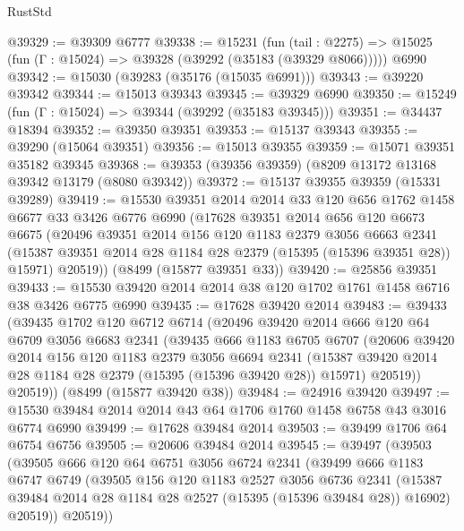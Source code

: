 \begin{lexlean}{RustStd}
\begin{coremodule}
@39329 := @39309 @6777
@39338 := @15231
    (fun (tail : @2275) => @15025 (fun (Γ : @15024) => @39328 (@39292 (@35183 (@39329 @8066)))))
    @6990
@39342 := @15030 (@39283 (@35176 (@15035 @6991)))
@39343 := @39220 @39342
@39344 := @15013 @39343
@39345 := @39329 @6990
@39350 := @15249 (fun (Γ : @15024) => @39344 (@39292 (@35183 @39345)))
@39351 := @34437 @18394
@39352 := @39350 @39351
@39353 := @15137 @39343
@39355 := @39290 (@15064 @39351)
@39356 := @15013 @39355
@39359 := @15071 @39351 @35182 @39345
@39368 := @39353 (@39356 @39359) (@8209 @13172 @13168 @39342 @13179 (@8080 @39342))
@39372 := @15137 @39355 @39359 (@15331 @39289)
@39419 := @15530
    @39351
    @2014
    @2014
    @33
    @120
    @656
    @1762
    @1458
    @6677
    @33
    @3426
    @6776
    @6990
    (@17628
      @39351
      @2014
      @656
      @120
      @6673
      @6675
      (@20496
        @39351
        @2014
        @156
        @120
        @1183
        @2379
        @3056
        @6663
        @2341
        (@15387 @39351 @2014 @28 @1184 @28 @2379 (@15395 (@15396 @39351 @28)) @15971)
        @20519))
    (@8499 (@15877 @39351 @33))
@39420 := @25856 @39351
@39433 := @15530 @39420 @2014 @2014 @38 @120 @1702 @1761 @1458 @6716 @38 @3426 @6775 @6990
@39435 := @17628 @39420 @2014
@39483 := @39433
    (@39435
      @1702
      @120
      @6712
      @6714
      (@20496
        @39420
        @2014
        @666
        @120
        @64
        @6709
        @3056
        @6683
        @2341
        (@39435
          @666
          @1183
          @6705
          @6707
          (@20606
            @39420
            @2014
            @156
            @120
            @1183
            @2379
            @3056
            @6694
            @2341
            (@15387 @39420 @2014 @28 @1184 @28 @2379 (@15395 (@15396 @39420 @28)) @15971)
            @20519))
        @20519))
    (@8499 (@15877 @39420 @38))
@39484 := @24916 @39420
@39497 := @15530 @39484 @2014 @2014 @43 @64 @1706 @1760 @1458 @6758 @43 @3016 @6774 @6990
@39499 := @17628 @39484 @2014
@39503 := @39499 @1706 @64 @6754 @6756
@39505 := @20606 @39484 @2014
@39545 := @39497
    (@39503
      (@39505
        @666
        @120
        @64
        @6751
        @3056
        @6724
        @2341
        (@39499
          @666
          @1183
          @6747
          @6749
          (@39505
            @156
            @120
            @1183
            @2527
            @3056
            @6736
            @2341
            (@15387 @39484 @2014 @28 @1184 @28 @2527 (@15395 (@15396 @39484 @28)) @16902)
            @20519))
        @20519))

\end{coremodule}
\end{lexlean}
